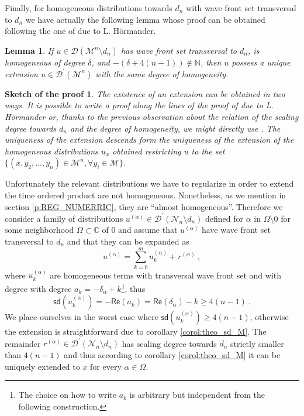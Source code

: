 \documentclass[11pt]{book}
\newcommand{\sd}{\mathsf{sd}}
\renewcommand{\Re}{\mathsf{Re}}
\newcommand{\Dcal}{\mathcal{D}}
\newcommand{\Mcal}{\mathcal{M}}
\newcommand{\Ncal}{\mathcal{N}}
\newcommand{\Cbb}{\mathbb{C}}
\newcommand{\Nbb}{\mathbb{N}}
\theoremstyle{break}
\newtheorem{lemma}{Lemma}[chapter]
\newtheorem*{sketch}{Sketch of the proof}[chapter]
\begin{document}
Finally, for homogeneous distributions towards $d_n$ with wave front set transversal to $d_n$ we have actually the following lemma whose proof can be obtained following the one of   \cite[theorem 3.2.3]{HORMANDER_1990} due to L. Hörmander.


\begin{lemma}\label{lemma:exte_homo}
If $u\in\Dcal(\Mcal^n\setminus d_n)$ has wave front set transversal to $d_n$, is homogeneous of degree $\delta$, and $-(\delta+4(n-1)) \notin \Nbb$, then $u$ possess a unique extension $u \in \Dcal^\prime(\Mcal^n)$ with the same degree of homogeneity.
\end{lemma}


\begin{sketch}
The existence of an extension can be obtained in two ways. It is possible to write a proof along the lines of the proof of \cite[theorem 3.2.3]{HORMANDER_1990} due to L. Hörmander or, thanks to the previous observation about the relation of the scaling degree towards $d_n$ and the degree of homogeneity, we might directly use \cite[theorem 6.9]{BF_2000}. The uniqueness of the extension descends form the uniqueness of the extension of the homogeneous distributions $u_x$ obtained restricting $u$ to the set $\{ (x,y_2,\dots, y_n)\in \Mcal^n, \forall y_i\in \Mcal\}$.  
\end{sketch}


Unfortunately the relevant distributions we have to regularize in order to extend the time ordered product are not homogeneous. Nonetheless, as we mention in section \ref{p:REG_NUMERRIC}, they are ``almost homogeneous''. Therefore we consider a family of distributions $u^{(\alpha)} \in \Dcal^\prime(\Ncal_n\setminus d_n)$ defined for $\alpha$ in $\Omega\setminus 0$ for some neighborhood $\Omega \subset \Cbb$ of $0$ and assume that $u^{(\alpha)}$ have wave front set transversal to $d_n$ and that they can be expanded as
%
\begin{equation*}
u^{(\alpha)}  = \sum_{k=0}^m u^{(\alpha)}_k + r^{(\alpha)} \ ,
\end{equation*}
%
where $u^{(\alpha)}_k$ are homogeneous terms with transversal wave front set and with degree with degree $a_k = - \delta_\alpha + k$\footnote{The choice on how to write $a_k$ is arbitrary but independent from the following construction.}, thus 
%
\begin{equation*}
\sd(u^{(\alpha)}_k) = - \Re(a_k)  =\Re\left(\delta_\alpha\right) - k \geq 4(n-1) \ .
\end{equation*}
%
We place ourselves in the worst case where $\sd(u^{(\alpha)}_k) \geq 4(n-1)$, otherwise the extension is straightforward due to corollary \ref{corol:theo_sd_M}. The remainder $r^{(\alpha)}\in \Dcal^\prime(\Ncal_n\setminus d_n)$ has scaling degree towards $d_n$ strictly smaller than $4(n-1)$ and thus according to corollary \ref{corol:theo_sd_M} it can be uniquely extended to $x$ for every $\alpha \in \Omega$.
\end{document}
